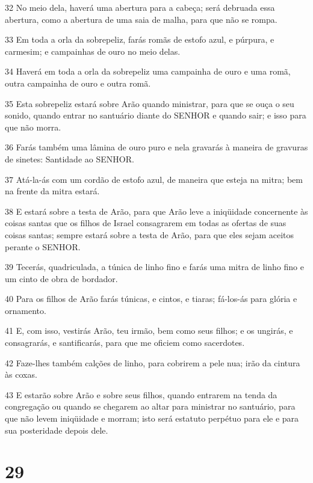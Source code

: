 \par 32 No meio dela, haverá uma abertura para a cabeça; será debruada essa abertura, como a abertura de uma saia de malha, para que não se rompa.
\par 33 Em toda a orla da sobrepeliz, farás romãs de estofo azul, e púrpura, e carmesim; e campainhas de ouro no meio delas.
\par 34 Haverá em toda a orla da sobrepeliz uma campainha de ouro e uma romã, outra campainha de ouro e outra romã.
\par 35 Esta sobrepeliz estará sobre Arão quando ministrar, para que se ouça o seu sonido, quando entrar no santuário diante do SENHOR e quando sair; e isso para que não morra.
\par 36 Farás também uma lâmina de ouro puro e nela gravarás à maneira de gravuras de sinetes: Santidade ao SENHOR.
\par 37 Atá-la-ás com um cordão de estofo azul, de maneira que esteja na mitra; bem na frente da mitra estará.
\par 38 E estará sobre a testa de Arão, para que Arão leve a iniqüidade concernente às coisas santas que os filhos de Israel consagrarem em todas as ofertas de suas coisas santas; sempre estará sobre a testa de Arão, para que eles sejam aceitos perante o SENHOR.
\par 39 Tecerás, quadriculada, a túnica de linho fino e farás uma mitra de linho fino e um cinto de obra de bordador.
\par 40 Para os filhos de Arão farás túnicas, e cintos, e tiaras; fá-los-ás para glória e ornamento.
\par 41 E, com isso, vestirás Arão, teu irmão, bem como seus filhos; e os ungirás, e consagrarás, e santificarás, para que me oficiem como sacerdotes.
\par 42 Faze-lhes também calções de linho, para cobrirem a pele nua; irão da cintura às coxas.
\par 43 E estarão sobre Arão e sobre seus filhos, quando entrarem na tenda da congregação ou quando se chegarem ao altar para ministrar no santuário, para que não levem iniqüidade e morram; isto será estatuto perpétuo para ele e para sua posteridade depois dele.

\chapter{29}

